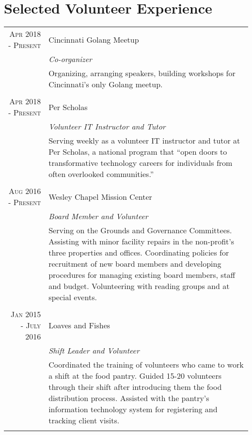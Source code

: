 \documentclass[a4paper,10pt]{article} %
\begin{document}
\section{Selected Volunteer Experience}
\begin{tabular}{r|p{11cm}}

\textsc{Apr 2018 - Present} & Cincinnati Golang Meetup\\
& \emph{Co-organizer} \\
& \footnotesize{Organizing, arranging speakers, building workshops for Cincinnati's only Golang meetup.} \\
\multicolumn{2}{c}{} \\

\textsc{Apr 2018 - Present} & Per Scholas\\
& \emph{Volunteer IT Instructor and Tutor} \\
& \footnotesize{Serving weekly as a volunteer IT instructor and tutor at Per Scholas, a national program that ``open doors to transformative technology careers for individuals from often overlooked communities.''} \\
\multicolumn{2}{c}{} \\

\textsc{Aug 2016 - Present} & Wesley Chapel Mission Center\\
& \emph{Board Member and Volunteer} \\
& \footnotesize{Serving on the Grounds and Governance Committees. Assisting with minor facility repairs in the non-profit's three properties and offices. Coordinating policies for recruitment of new board members and developing procedures for managing existing board members, staff and budget. Volunteering with reading groups and at special events.} \\
\multicolumn{2}{c}{} \\

\textsc{Jan 2015 - July 2016} & Loaves and Fishes\\
& \emph{Shift Leader and Volunteer} \\
& \footnotesize{Coordinated the training of volunteers who came to work a shift at the food pantry. Guided 15-20 volunteers through their shift after introducing them the food distribution process. Assisted with the pantry's information technology system for registering and tracking client visits.} \\
\multicolumn{2}{c}{} \\


\end{tabular}
\end{document}
